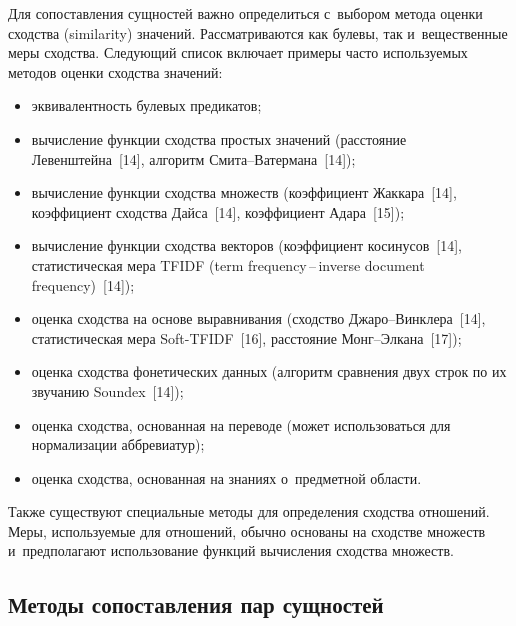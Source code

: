 \begin{multicols}{2}
  Для сопоставления сущностей важно определиться с~выбором метода оценки сходства
(similarity) значений. Рассматриваются как булевы, так и~вещественные меры сходства.
Следующий список включает примеры часто используемых методов оценки сходства
значений:
  \begin{itemize}
\item эквивалентность булевых предикатов;\\[-13pt]
\item вычисление функции сходства простых значений (расстояние Левенштейна~[14],
алгоритм Сми\-та--Ва\-тер\-ма\-на~[14]);\\[-13pt]
\item вычисление функции сходства множеств (коэффициент Жаккара~[14], коэффициент
сходства Дайса~[14], коэффициент Адара~[15]);\\[-13pt]
\item вычисление функции сходства векторов (коэффициент косинусов~[14],
статистическая мера TFIDF (term frequency\,--\,inverse document frequency)~[14]);\\[-13pt]
\item оценка сходства на основе выравнивания (сходство Джа\-ро--Винк\-ле\-ра~[14],
статистическая мера Soft-TFIDF~[16], расстояние Монг--Эл\-ка\-на~[17]);\\[-13pt]
\item оценка сходства фонетических данных (алгоритм сравнения двух строк по их
звучанию Soundex~[14]);\\[-13pt]
\item оценка сходства, основанная на переводе (может использоваться для нормализации
аббревиатур);\\[-13pt]
\item оценка сходства, основанная на знаниях о~предметной области.
\end{itemize}

  Также существуют специальные методы для определения сходства отношений. Меры,
используемые для отношений, обычно основаны на сходстве множеств и~предполагают
использование функций вычисления сходства множеств.

\vspace*{-3pt}

  \subsection{Методы сопоставления пар сущностей}

  \vspace*{-3pt}


\end{multicols}
